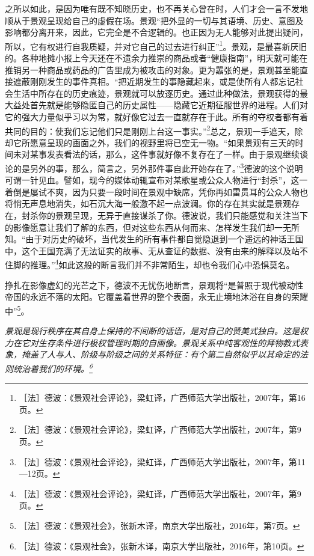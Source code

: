 \documentclass[fontset=fandol, a4paper, 12pt, openright]{ctexbook}
\renewenvironment{quote}
  {\list{}{\rightmargin\leftmargin}%
   \item\relax\small\itshape\color{darkgray}}
  {\endlist}
\begin{document}
之所以如此，是因为唯有既不知晓历史，也不再关心曾在时，人们才会一言不发地顺从于景观呈现给自己的虚假在场。景观“把外显的一切与其语境、历史、意图及影响都分离开来，因此，它完全是不合逻辑的。也正因为无人能够对此提出疑问，所以，它有权进行自我质疑，并对它自己的过去进行纠正”\footnote{［法］德波：《景观社会评论》，梁虹译，广西师范大学出版社，2007年，第16页。}。{\kaishu 景观，是最喜新厌旧的。各种地摊小报上今天还在不遗余力推崇的商品或者“健康指南”，明天就可能在推销另一种商品或药品的广告里成为被攻击的对象。}更为嚣张的是，景观甚至能直接遮蔽刚刚发生的事件真相。“把近期发生的事隐藏起来，或是使所有人都忘记社会生活中所存在的历史痕迹，景观就可以放逐历史。通过此种做法，景观获得的最大益处首先就是能够隐匿自己的历史属性——隐藏它近期征服世界的进程。人们对它的强大力量似乎习以为常，就好像它过去一直就存在于此。所有的夺权者都有着共同的目的：使我们忘记他们只是刚刚上台这一事实。”\footnote{［法］德波：《景观社会评论》，梁虹译，广西师范大学出版社，2007年，第9页。}总之，景观一手遮天，除却它所愿意呈现的画面之外，我们的视野里将已空无一物。“如果景观有三天的时间未对某事发表看法的话，那么，这件事就好像不复存在了一样。由于景观继续谈论的是另外的事，那么，简言之，另外那件事自此开始存在了。”\footnote{［法］德波：《景观社会评论》，梁虹译，广西师范大学出版社，2007年，第11—12页。}德波的这个说明可谓一针见血。{\kaishu 譬如，现今的媒体动辄宣布对某歌星或公众人物进行“封杀”，这一着倒是屡试不爽，因为只要一段时间在景观中缺席，凭你再如雷贯耳的公众人物也将悄无声息地消失，如石沉大海一般激不起一点波澜。你的存在其实就是景观存在，封杀你的景观呈现，无异于直接谋杀了你。}德波说，我们只能感觉和关注当下的影像愿意让我们了解的东西，但对这些东西从何而来、怎样发生我们却一无所知。“由于对历史的破坏，当代发生的所有事件都自觉隐退到一个遥远的神话王国中，这个王国充满了无法证实的故事、无从查证的数据、没有由来的解释以及站不住脚的推理。”\footnote{［法］德波：《景观社会评论》，梁虹译，广西师范大学出版社，2007年，第9页。}如此这般的断言我们并不非常陌生，却也令我们心中恐惧莫名。

挣扎在影像虚幻的光芒之下，德波不无忧伤地断言，景观将“是普照于现代被动性帝国的永远不落的太阳。它覆盖着世界的整个表面，永无止境地沐浴在自身的荣耀中”\footnote{［法］德波：《景观社会》，张新木译，南京大学出版社，2016年，第7页。}。

\begin{quote}
景观是现行秩序在其自身上保持的不间断的话语，是对自己的赞美式独白。这是权力在它对生存条件进行极权管理时期的自画像。景观关系中纯客观性的拜物教式表象，掩盖了人与人、阶级与阶级之间的关系特征：有个第二自然似乎以其命定的法则统治着我们的环境。\footnote{［法］德波：《景观社会》，张新木译，南京大学出版社，2016年，第10页。}
\end{quote}
\end{document}
